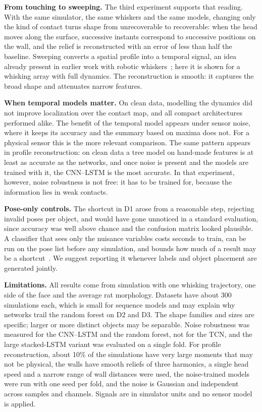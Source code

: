 \documentclass[conference]{IEEEtran}
\begin{document}
\textbf{From touching to sweeping.} The third experiment supports that reading. With the same simulator, the same whiskers and the same models, changing only the kind of contact turns shape from unrecoverable to recoverable: when the head moves along the surface, successive instants correspond to successive positions on the wall, and the relief is reconstructed with an error of less than half the baseline. Sweeping converts a spatial profile into a temporal signal, an idea already present in earlier work with robotic whiskers~\cite{solomon2006}; here it is shown for a whisking array with full dynamics. The reconstruction is smooth: it captures the broad shape and attenuates narrow features.

\textbf{When temporal models matter.} On clean data, modelling the dynamics did not improve localization over the contact map, and all compact architectures performed alike. The benefit of the temporal model appears under sensor noise, where it keeps its accuracy and the summary based on maxima does not. For a physical sensor this is the more relevant comparison. The same pattern appears in profile reconstruction: on clean data a tree model on hand-made features is at least as accurate as the networks, and once noise is present and the models are trained with it, the CNN--LSTM is the most accurate. In that experiment, however, noise robustness is not free: it has to be trained for, because the information lies in weak contacts.

\textbf{Pose-only controls.} The shortcut in D1 arose from a reasonable step, rejecting invalid poses per object, and would have gone unnoticed in a standard evaluation, since accuracy was well above chance and the confusion matrix looked plausible. A classifier that sees only the nuisance variables costs seconds to train, can be run on the pose list before any simulation, and bounds how much of a result may be a shortcut~\cite{geirhos2020}. We suggest reporting it whenever labels and object placement are generated jointly.

\textbf{Limitations.} All results come from simulation with one whisking trajectory, one side of the face and the average rat morphology. Datasets have about 300 simulations each, which is small for sequence models and may explain why networks trail the random forest on D2 and D3. The shape families and sizes are specific; larger or more distinct objects may be separable. Noise robustness was measured for the CNN--LSTM and the random forest, not for the TCN, and the large stacked-LSTM variant was evaluated on a single fold. For profile reconstruction, about 10\% of the simulations have very large moments that may not be physical, the walls have smooth reliefs of three harmonics, a single head speed and a narrow range of wall distances were used, the noise-trained models were run with one seed per fold, and the noise is Gaussian and independent across samples and channels. Signals are in simulator units and no sensor model is applied.
\end{document}
